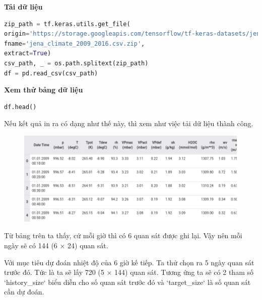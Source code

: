 \vspace{0.25cm}
\changefontsizes{14pt}
\setlength{\parindent}{0cm}
\textbf{Tải dữ liệu}


\begin{lstlisting}[language=Python]
zip_path = tf.keras.utils.get_file(
origin='https://storage.googleapis.com/tensorflow/tf-keras-datasets/jena_climate_2009_2016.csv.zip',
fname='jena_climate_2009_2016.csv.zip',
extract=True)
csv_path, _ = os.path.splitext(zip_path)
df = pd.read_csv(csv_path)
\end{lstlisting}


\vspace{0.25cm}
\changefontsizes{13pt}
\setlength{\parindent}{0cm}
\textbf{Xem thử bảng dữ liệu}

\begin{lstlisting}[language=Python]
df.head()
\end{lstlisting}


\vspace{0.25cm}
\changefontsizes{13pt}
\setlength{\parindent}{0cm}
Nếu kết quả in ra có dạng như thế này, thì xem như việc tải dữ liệu thành công.

\vspace{-0.5cm}
\begin{center}
	\begin{figure}[h]
		\begin{center}
			\includegraphics[scale=0.52]{./images/tables.png}
		\end{center}
	\end{figure}
\end{center}

Từ bảng trên ta thấy, cứ mỗi giờ thì có 6 quan sát được ghi lại. Vậy nên mỗi ngày sẽ có 144 (6 $\times$ 24) quan sát.

\smallskip
Với mục tiêu dự đoán nhiệt độ của 6 giờ kế tiếp. Ta thử chọn ra 5 ngày quan sát trước đó. Tức là ta sẽ lấy 720 (5 $\times$ 144) quan sát. Tương ứng ta sẽ có 2 tham số `history\_size` biểu diễn cho số quan sát trước đó và `target\_size` là số quan sát cần dự đoán. 


